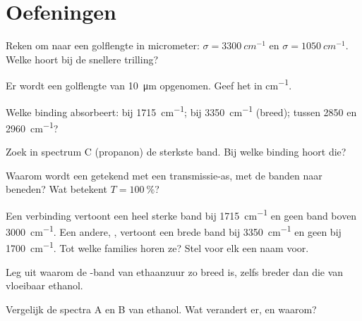 \section{Oefeningen}

\begin{exercise}[$\star$]\label{exo:g11:infrared:1}
Reken om naar een golflengte in micrometer: $\sigma = \qty{3300}{cm^{-1}}$
en $\sigma = \qty{1050}{cm^{-1}}$. Welke hoort bij de snellere trilling?
\end{exercise}

\begin{exercise}[$\star$]\label{exo:g11:infrared:2}
Er wordt een golflengte van \qty{10}{\micro m} opgenomen. Geef het
 in \si{cm^{-1}}.
\end{exercise}

\begin{exercise}[$\star$]\label{exo:g11:infrared:3}
Welke binding absorbeert: bij \qty{1715}{cm^{-1}}; bij \qty{3350}{cm^{-1}}
(breed); tussen 2850 en \qty{2960}{cm^{-1}}?
\end{exercise}

\begin{exercise}[$\star$]\label{exo:g11:infrared:4}
Zoek in spectrum C (propanon) de sterkste band. Bij welke binding hoort
die?
\end{exercise}

\begin{exercise}[$\star$]\label{exo:g11:infrared:5}
Waarom wordt een  getekend met een transmissie-as, met
de banden naar beneden? Wat betekent $T = \qty{100}{\percent}$?
\end{exercise}

\begin{exercise}[$\star\star$]\label{exo:g11:infrared:6}
Een verbinding  vertoont een heel sterke band bij
\qty{1715}{cm^{-1}} en geen band boven \qty{3000}{cm^{-1}}. Een andere,
, vertoont een brede band bij \qty{3350}{cm^{-1}} en geen bij
\qty{1700}{cm^{-1}}. Tot welke families horen ze? Stel voor elk een naam
voor.
\end{exercise}

\begin{exercise}[$\star\star$]\label{exo:g11:infrared:7}
Leg uit waarom de -band van ethaanzuur zo breed is, zelfs breder
dan die van vloeibaar ethanol.
\end{exercise}

\begin{exercise}[$\star\star$]\label{exo:g11:infrared:8}
Vergelijk de spectra A en B van ethanol. Wat verandert er, en waarom?
\end{exercise}

